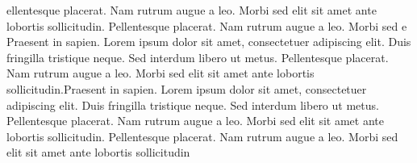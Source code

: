 ellentesque placerat. Nam rutrum augue a leo. Morbi sed elit sit amet ante
lobortis sollicitudin. Pellentesque placerat. Nam rutrum augue a leo. Morbi sed
e
Praesent in sapien. Lorem ipsum dolor sit amet, consectetuer adipiscing elit.
Duis fringilla tristique neque. Sed interdum libero ut metus. Pellentesque
placerat. Nam rutrum augue a leo. Morbi sed elit sit amet ante lobortis
sollicitudin.Praesent in sapien. Lorem ipsum dolor sit amet, consectetuer
adipiscing elit. Duis fringilla tristique neque. Sed interdum libero ut metus.
Pellentesque placerat. Nam rutrum augue a leo. Morbi sed elit sit amet ante
lobortis sollicitudin. Pellentesque placerat. Nam rutrum augue a leo. Morbi sed
elit sit amet ante lobortis sollicitudin









































